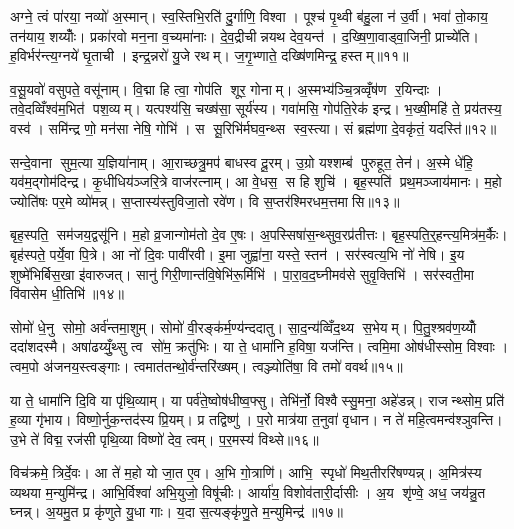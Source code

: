 अग्ने॒ त्वं पा॑रया॒ नव्यो॑ अ॒स्मान्। स्व॒स्तिभि॒रति॑ दु॒र्गाणि॒ विश्वा। पूश्च॑ पृ॒थ्वी ब॑हु॒ला न॑ उ॒र्वी। भवा॑ तो॒काय॒ तन॑याय॒ शय्योँः। प्रका॑रवो मन॒ना व॒च्यमा॑नाः। दे॒व॒द्रीचीन्नयथ देव॒यन्त॑। द॒ख्षि॒णा॒वाड्वा॒जिनी॒ प्राच्ये॑ति। ह॒विर्भर॑न्त्य॒ग्नये॑ घृ॒ताची। इन्द्र॒न्नरो॑ यु॒जे रथम्। ज॒गृ॒भ्णाते॒ दख्षि॑णमिन्द्र॒ हस्तम्॥११॥

व॒सू॒यवो॑ वसुपते॒ वसू॑नाम्। वि॒द्मा हि त्वा॒ गोप॑ति शूर॒ गोनाम्। अ॒स्मभ्य॑ञ्चि॒त्रव्वृँष॑ण र॒यिन्दाः। तवे॒दव्विँश्व॑म॒भित॑ पश॒व्यम्। यत्पश्य॑सि॒ चख्ष॑सा॒ सूर्य॑स्य। गवा॑मसि॒ गोप॑ति॒रेक॑ इन्द्र। भ॒ख्षी॒महि॑ ते॒ प्रय॑तस्य॒ वस्व॑। समि॑न्द्र णो॒ मन॑सा नेषि॒ गोभि॑। स सू॒रिभि॑र्मघव॒न्थ्स स्व॒स्त्या। सं ब्रह्म॑णा दे॒वकृ॑तं॒ यदस्ति॑॥१२॥

सन्दे॒वाना सुम॒त्या य॒ज्ञिया॑नाम्। आ॒राच्छत्रु॒मप॑ बाधस्व दू॒रम्। उ॒ग्रो यश्शम्ब॑ पुरुहूत॒ तेन॑। अ॒स्मे धे॑हि॒ यव॑म॒द्गोम॑दिन्द्र। कृ॒धीधिय॑ञ्जरि॒त्रे वाज॑रत्नाम्। आ वे॒धस॒ स हि शुचि॑। बृह॒स्पति॑ प्रथ॒मञ्जाय॑मानः। म॒हो ज्योति॑षः पर॒मे व्यो॑मन्न्। स॒प्तास्य॑स्तुविजा॒तो रवे॑ण। वि स॒प्तर॑श्मिरधम॒त्तमासि॥१३॥

बृह॒स्पति॒ सम॑जय॒द्वसू॑नि। म॒हो व्र॒जान्गोम॑तो दे॒व ए॒षः। अ॒पस्सिषा॑स॒न्थ्सुव॒रप्र॑तीत्तः। बृह॒स्पति॒र्॒हन्त्य॒मित्र॑म॒र्कैः। बृह॑स्पते॒ पर्ये॒वा पि॒त्रे। आ नो॑ दि॒वः पावी॑रवी। इ॒मा जुह्वा॑ना॒ यस्ते॒ स्तन॑। सर॑स्वत्य॒भि नो॑ नेषि। इ॒य शुष्मे॑भिर्बिस॒खा इ॑वारुजत्। सानु॑ गिरी॒णान्त॑वि॒षेभि॑रू॒र्मिभि॑। पा॒रा॒व॒द॒घ्नीमव॑से सुवृ॒क्तिभि॑। सर॑स्वती॒मा वि॑वासेम धी॒तिभि॑॥१४॥\anuvakamend[दे॒व॒यानैर्दे॒वास्सुपू॑तय्यँजत्र॒ हस्त॒मस्ति॒ तमास्यू॒र्मिभि॒र्द्वे च॑]

सोमो॑ धे॒नु सोमो॒ अर्व॑न्तमा॒शुम्। सोमो॑ वी॒रङ्क॑र्म॒ण्य॑न्ददातु। सा॒द॒न्य॑व्विँद॒थ्य स॒भेयम्। पि॒तु॒श्श्रव॑ण॒य्योँ ददा॑शदस्मै। अषा॑ढय्युँ॒थ्सु त्व सो॑म॒ क्रतु॑भिः। या ते॒ धामा॑नि ह॒विषा॒ यज॑न्ति। त्वमि॒मा ओष॑धीस्सोम॒ विश्वाः। त्वम॒पो अ॑जनय॒स्त्वङ्गाः। त्वमात॑तन्थो॒र्व॑न्तरि॑ख्षम्। त्वञ्ज्योति॑षा॒ वि तमो॑ ववर्थ॥१५॥

या ते॒ धामा॑नि दि॒वि या पृ॑थि॒व्याम्। या पर्व॑ते॒ष्वोष॑धीष्व॒फ्सु। तेभि॑र्नो॒ विश्वैस्सु॒मना॒ अहे॑डन्न्। राजन्थ्सोम॒ प्रति॑ ह॒व्या गृ॑भाय। विष्णो॒र्नुक॒न्तद॑स्य प्रि॒यम्। प्र तद्विष्णु॑। प॒रो मात्र॑या त॒नुवा॑ वृधान। न ते॑ महि॒त्वमन्व॑श्ञुवन्ति। उ॒भे ते॑ विद्म॒ रज॑सी पृथि॒व्या विष्णो॑ देव॒ त्वम्। प॒र॒मस्य॑ विथ्से॥१६॥

विच॑क्रमे॒ त्रिर्दे॒वः। आ ते॑ म॒हो यो जा॒त ए॒व। अ॒भि गो॒त्राणि॑। आभि॒ स्पृधो॑ मिथ॒तीररि॑षण्यन्न्। अ॒मित्र॑स्य व्यथया म॒न्युमि॑न्द्र। आभि॒र्विश्वा॑ अभि॒युजो॒ विषू॑चीः। आर्या॑य॒ विशोव॑तारी॒र्दासीः। अ॒य शृ॑ण्वे॒ अध॒ जय॑न्नु॒त घ्नन्न्। अ॒यमु॒त प्र कृ॑णुते यु॒धा गाः। य॒दा स॒त्यङ्कृ॑णु॒ते म॒न्युमिन्द्र॑॥१७॥

